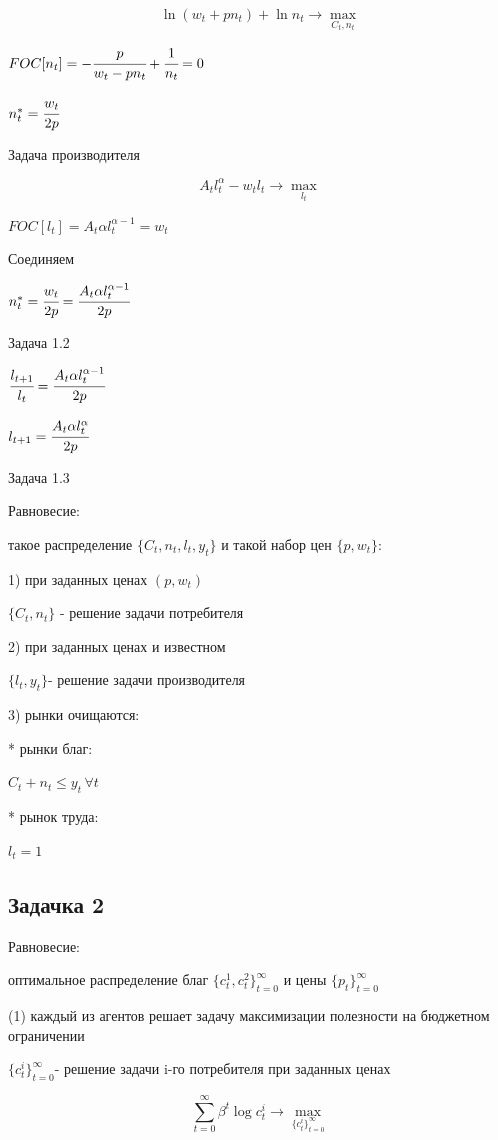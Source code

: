 \documentclass[reqno]{article}
\theoremstyle{definition}
\theoremstyle{definition}
\theoremstyle{definition}
\theoremstyle{definition}
\theoremstyle{definition}
\theoremstyle{definition}
\theoremstyle{definition}
\theoremstyle{definition}
\theoremstyle{definition}
\begin{document}
	$$\ln (w_t + p n_t) + \ln n_t \rightarrow \max\limits_{C_t,n_t}$$
	
	$FOC[n_t] = -\cfrac{p}{w_t - p n_t} + \cfrac{1}{n_t}=0$
	
	$n_t^* = \cfrac{w_t}{2p}$
	
	Задача производителя
	
	$$A_t l_t^\alpha - w_t l_t \rightarrow \max\limits_{l_t}$$
	
	$FOC[l_t] = A_t \alpha l_t^{\alpha-1}=w_t$
	
	Соединяем
	
	$n_t^* = \cfrac{w_t}{2p} = \cfrac{A_t \alpha l_t^{\alpha-1}}{2p}$
	
	Задача 1.2
	
	$\cfrac{l_{t+1}}{l_t} = \cfrac{A_t \alpha l_t^{\alpha -1}}{2p}$
	
	$l_{t+1} = \cfrac{A_t \alpha l_t^{\alpha}}{2p}$
	
	Задача 1.3
	
	Равновесие:
	
	такое распределение $\{C_t,n_t,l_t,y_t\}$ и такой набор цен $\{p, w_t\}$:
	
	1) при заданных ценах $(p, w_t)$ 
	
	$\{C_t,n_t\}$ - решение задачи потребителя
	
	2) при заданных ценах и известном 
	
	$\{l_t,y_t\}$- решение задачи производителя
	
	3) рынки очищаются:
	
	* рынки благ:
	
	$C_t + n_t \leq y_t \, \forall t$
	
	* рынок труда:
	
	$l_t = 1$ \\ 
	
	\subsection{Задачка 2}
	
	Равновесие:
	
	оптимальное распределение благ $\{c_t^1, c_t^2\}_{t=0}^\infty$ и цены $\{p_t\}_{t=0}^\infty$
	
	(1) каждый из агентов решает задачу максимизации полезности на бюджетном ограничении 
	
	$\{c_t^i\}_{t=0}^\infty $- решение задачи i-го потребителя при заданных ценах
	
	$$\sum_{t=0}^\infty \beta^t \log c_t^i \rightarrow \max\limits_{\{c_t^i\}_{t=0}^\infty}$$
	
\end{document}
